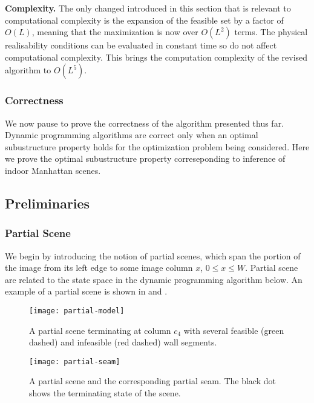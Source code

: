 \textbf{Complexity.} The only changed introduced in this section that
is relevant to computational complexity is the expansion of the
feasible set by a factor of $O(L)$, meaning that the maximization
 is now over $O(L^2)$ terms. The
physical realisability conditions can be evaluated in constant time so
do not affect computational complexity. This brings the computation
complexity of the revised algorithm to $O(L^5)$.

\subsubsection{Correctness}

We now pause to prove the correctness of the algorithm presented
thus far. Dynamic programming algorithms are correct only when an
optimal subustructure property holds for the optimization problem
being considered. Here we prove the optimal subustructure property
correseponding to inference of indoor Manhattan scenes.

\subsection{Preliminaries}
\label{sect:preliminaries}

\subsubsection{Partial Scene}

We begin by introducing the notion of partial scenes, which span the
portion of the image from its left edge to some image column $x$, $0
\leq x \leq W$. Partial scene are related to the state space in the
dynamic programming algorithm below. An example of a partial scene is
shown in  and .

\begin{figure}[tb]
  \centering
  \texttt{[image: partial-model]}
  \caption{A partial scene terminating at column $c_4$ with several
    feasible (green dashed) and infeasible (red dashed) wall
    segments.}
  \label{fig:partial-scene}
\end{figure}

\begin{figure}[tb]
  \centering
  \texttt{[image: partial-seam]}
  \caption{A partial scene and the corresponding partial seam. The
    black dot shows the terminating state of the scene.}
  \label{fig:partial-seam}
\end{figure}

